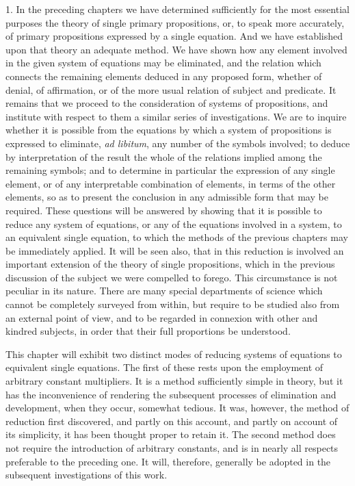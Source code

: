 \documentclass[oneside]{book}
\begin{document}
1. In the preceding chapters we have determined sufficiently
for the most essential purposes the theory of single primary
propositions, or, to speak more accurately, of primary propositions
expressed by a single equation. And we have established
upon that theory an adequate method. We have shown
how any element involved in the given system of equations may
be eliminated, and the relation which connects the remaining
elements deduced in any proposed form, whether of denial, of affirmation,
or of the more usual relation of subject and predicate.
It remains that we proceed to the consideration of systems of
propositions, and institute with respect to them a similar series
of investigations. We are to inquire whether it is possible from
the equations by which a system of propositions is expressed to
eliminate, \textit{ad libitum}, any number of the symbols involved; to
deduce by interpretation of the result the whole of the relations
implied among the remaining symbols; and to determine in particular
the expression of any single element, or of any interpretable
combination of elements, in terms of the other elements,
so as to present the conclusion in any admissible form that may
be required. These questions will be answered by showing that it
is possible to reduce any system of equations, or any of the equations
involved in a system, to an equivalent single equation, to
which the methods of the previous chapters may be immediately
applied. It will be seen also, that in this reduction is involved
an important extension of the theory of single propositions, which
in the previous discussion of the subject we were compelled to
forego. This circumstance is not peculiar in its nature. There
are many special departments of science which cannot be completely
surveyed from within, but require to be studied also from
an external point of view, and to be regarded in connexion with
other and kindred subjects, in order that their full proportions
be understood.

This chapter will exhibit two distinct modes of reducing
systems of equations to equivalent single equations. The first
of these rests upon the employment of arbitrary constant multipliers.
It is a method sufficiently simple in theory, but it has the
inconvenience of rendering the subsequent processes of elimination
and development, when they occur, somewhat tedious. It was,
however, the method of reduction first discovered, and partly on
this account, and partly on account of its simplicity, it has been
thought proper to retain it. The second method does not require
the introduction of arbitrary constants, and is in nearly
all respects preferable to the preceding one. It will, therefore,
generally be adopted in the subsequent investigations of this
work.
\end{document}
